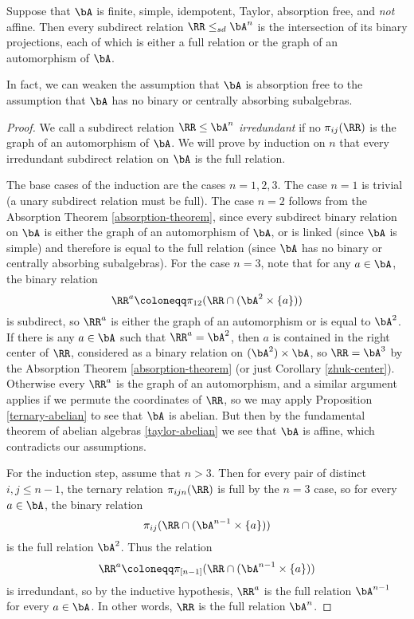 \begin{thm}\label{absorption-free} Suppose that $\bA$ is finite, simple, idempotent, Taylor, absorption free, and \emph{not} affine. Then every subdirect relation $\RR \le_{sd} \bA^n$ is the intersection of its binary projections, each of which is either a full relation or the graph of an automorphism of $\bA$.

In fact, we can weaken the assumption that $\bA$ is absorption free to the assumption that $\bA$ has no binary or centrally absorbing subalgebras.
\end{thm}
\begin{proof} We call a subdirect relation $\RR \le \bA^n$ \emph{irredundant} if no $\pi_{ij}(\RR)$ is the graph of an automorphism of $\bA$. We will prove by induction on $n$ that every irredundant subdirect relation on $\bA$ is the full relation.

The base cases of the induction are the cases $n = 1,2,3$. The case $n = 1$ is trivial (a unary subdirect relation must be full). The case $n=2$ follows from the Absorption Theorem \ref{absorption-theorem}, since every subdirect binary relation on $\bA$ is either the graph of an automorphism of $\bA$, or is linked (since $\bA$ is simple) and therefore is equal to the full relation (since $\bA$ has no binary or centrally absorbing subalgebras). For the case $n=3$, note that for any $a \in \bA$, the binary relation
\[
\RR^a \coloneqq \pi_{12}(\RR \cap (\bA^2\times\{a\}))
\]
is subdirect, so $\RR^a$ is either the graph of an automorphism or is equal to $\bA^2$. If there is any $a \in \bA$ such that $\RR^a = \bA^2$, then $a$ is contained in the right center of $\RR$, considered as a binary relation on $(\bA^2)\times \bA$, so $\RR = \bA^3$ by the Absorption Theorem \ref{absorption-theorem} (or just Corollary \ref{zhuk-center}). Otherwise every $\RR^a$ is the graph of an automorphism, and a similar argument applies if we permute the coordinates of $\RR$, so we may apply Proposition \ref{ternary-abelian} to see that $\bA$ is abelian. But then by the fundamental theorem of abelian algebras \ref{taylor-abelian} we see that $\bA$ is affine, which contradicts our assumptions.

For the induction step, assume that $n > 3$. Then for every pair of distinct $i,j \le n-1$, the ternary relation $\pi_{ijn}(\RR)$ is full by the $n=3$ case, so for every $a \in \bA$, the binary relation
\[
\pi_{ij}(\RR \cap (\bA^{n-1}\times \{a\}))
\]
is the full relation $\bA^2$. Thus the relation
\[
\RR^a \coloneqq \pi_{[n-1]}(\RR \cap (\bA^{n-1}\times \{a\}))
\]
is irredundant, so by the inductive hypothesis, $\RR^a$ is the full relation $\bA^{n-1}$ for every $a \in \bA$. In other words, $\RR$ is the full relation $\bA^n$.
\end{proof}

